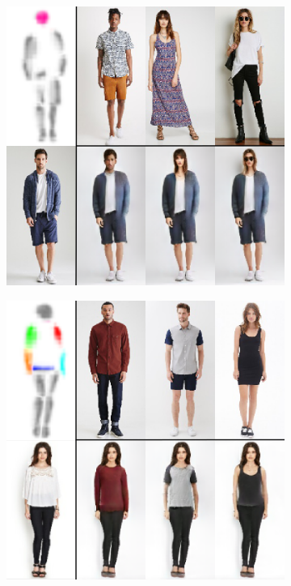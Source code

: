 	\begin{figure}[t]
		\begin{subfigure}{0.49\linewidth}
		\centering
		\includegraphics[trim={0cm 0cm 0cm 0cm},clip, width=1.\linewidth]{fig/part_head}\caption{}
		\label{fig:part3_00}
		\end{subfigure}
		\begin{subfigure}{0.49\linewidth}
		\centering
		\includegraphics[trim={0cm 0cm 0cm 0cm},clip, width=1.\linewidth]{fig/part_body}\caption{}

\end{subfigure}
\end{figure}
